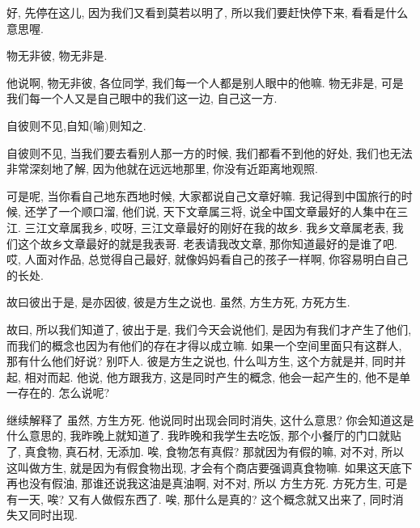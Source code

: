 \documentclass[11pt]{article}
\begin{document}
好, 先停在这儿, 因为我们又看到莫若以明了, 所以我们要赶快停下来, 看看是什么意思喔. 

{\begin{center}
		{\color{green} 物无非彼, 物无非是.}
\end{center}}

\vspace{-0.5cm}

他说啊, {\color{blue} 物无非彼}, 各位同学, 我们每一个人都是别人眼中的他嘛. {\color{blue} 物无非是}, 可是我们每一个人又是自己眼中的我们这一边, 自己这一方.

{\begin{center}
		{\color{green} 自彼则不见,自知(喻)则知之.}
\end{center}}

\vspace{-0.5cm}

{\color{blue} 自彼则不见}, 当我们要去看别人那一方的时候, 我们都看不到他的好处, 我们也无法非常深刻地了解, 因为他就在远远地那里, 你没有近距离地观照.

可是呢, 当你看自己地东西地时候, 大家都说自己文章好嘛. 我记得到中国旅行的时候, 还学了一个顺口溜, 他们说, 天下文章属三将, 说全中国文章最好的人集中在三江. 三江文章属我乡, 哎呀, 三江文章最好的刚好在我的故乡. 我乡文章属老表, 我们这个故乡文章最好的就是我表哥. 老表请我改文章, 那你知道最好的是谁了吧. 哎, 人面对作品, 总觉得自己最好, 就像妈妈看自己的孩子一样啊, 你容易明白自己的长处.

\begin{center}
	{\color{green} 故曰彼出于是, 是亦因彼, 彼是方生之说也. 虽然, 方生方死, 方死方生.}
\end{center}

\vspace{-0.5cm}

故曰, 所以我们知道了, {\color{blue} 彼出于是}, 我们今天会说他们, 是因为有我们才产生了他们, 而我们的概念也因为有他们的存在才得以成立嘛. 如果一个空间里面只有这群人, 那有什么他们好说? 别吓人. {\color{blue} 彼是方生之说也}, 什么叫方生, 这个方就是并, 同时并起, 相对而起. 他说, 他方跟我方, 这是同时产生的概念, 他会一起产生的, 他不是单一存在的. 怎么说呢? 

继续解释了{\color{blue} 虽然, 方生方死}. 他说同时出现会同时消失, 这什么意思? 你会知道这是什么意思的, 我昨晚上就知道了. 我昨晚和我学生去吃饭, 那个小餐厅的门口就贴了, 真食物, 真石材, 无添加. 唉, 食物怎有真假? 那就因为有假的嘛, 对不对, 所以这叫做方生, 就是因为有假食物出现, 才会有个商店要强调真食物嘛. 如果这天底下再也没有假油, 那谁还说我这油是真油啊, 对不对, 所以{\color{blue} 方生方死}. {\color{blue} 方死方生,} 可是有一天, 唉? 又有人做假东西了. 唉, 那什么是真的? 这个概念就又出来了, 同时消失又同时出现.
\end{document}
